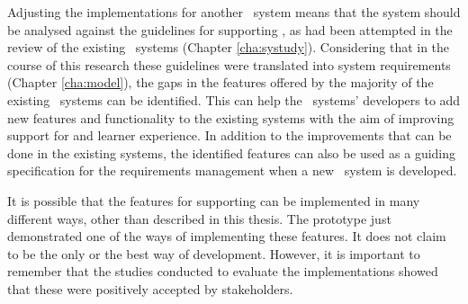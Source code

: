 Adjusting the implementations for another \ep~system means that the system
should be analysed against the guidelines for supporting \LLLsn, as had been
attempted in the review of the existing \ep~systems (Chapter \ref{cha:systudy}).
Considering that in the course of this research these guidelines were translated
into system requirements (Chapter \ref{cha:model}), the gaps in the features
offered by the majority of the existing \ep~systems can be identified. This can
help the \ep~systems' developers to add new features and functionality to the
existing systems with the aim of improving support for \LLLs and learner
experience. In addition to the improvements that can be done in the existing
systems, the identified features can also be used as a guiding specification for
the requirements management when a new \ep~system is developed.

It is possible that the features for supporting \LLLs can be implemented in many
different ways, other than described in this thesis. The prototype just
demonstrated one of the ways of implementing these features. It does not claim
to be the only or the best way of development. However, it is important to
remember that the studies conducted to evaluate the implementations showed that
these were positively accepted by stakeholders.
